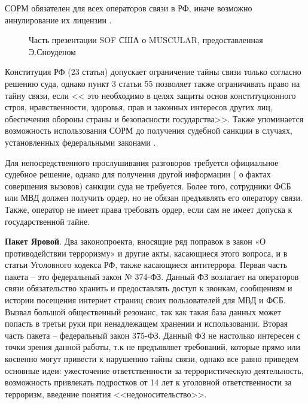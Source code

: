 	СОРМ обязателен для всех операторов связи в РФ, иначе возможно аннулирование их лицензии \cite{SORM1}. %
		\begin{figure*}[h!]
		\caption{ Часть презентации SOF США о MUSCULAR, предоставленная Э.Сноуденом}
	\end{figure*} 
	
	Конституция РФ (23 статья) допускает ограничение тайны связи только согласно решению суда, однако пункт 3 статьи 55 позволяет также ограничивать право на тайну связи, если << это необходимо в целях защиты основ конституционного строя, нравственности, здоровья, прав и законных интересов других лиц, обеспечения обороны страны и безопасности государства>>. Также упоминается возможность использования СОРМ до получения судебной санкции в случаях, установленных федеральными законами \cite{SORM2}. %
	
	Для непосредственного прослушивания разговоров требуется официальное судебное решение, однако для получения другой информации (  о фактах совершения вызовов) санкции суда не требуется. Более того, сотрудники ФСБ или МВД должен получить ордер, но не обязан предъявлять его оператору связи. Также, оператор не имеет права требовать ордер, если сам не имеет допуска к государственной тайне. 
	
	\textbf{Пакет Яровой}. Два законопроекта, вносящие ряд поправок в закон «О противодействии терроризму» и другие акты, касающиеся этого вопроса, и в статьи Уголовного кодекса РФ, также касающиеся антитеррора. Первая часть пакета -- это федеральный 	закон № 374-ФЗ. Данный ФЗ возлагает на операторов связи обязательство хранить и предоставлять доступ к звонкам, сообщениям и истории посещения интернет страниц своих пользователей для МВД и ФСБ. Вызвал большой общественный резонанс, так как такая база данных может попасть в третьи руки при ненадлежащем хранении и использовании. Вторая часть пакета -- федеральный закон 375-ФЗ. Данный ФЗ не настолько интересен с точки зрения данной работы, т.к не предъявляет требований, которые прямо или косвенно могут привести к нарушению тайны связи, однако все равно приведем основные идеи: ужесточение ответственности за террористическую деятельность, возможность привлекать подростков от 14 лет к уголовной ответственности за терроризм, введение понятия <<недоносительство>>.  
	
